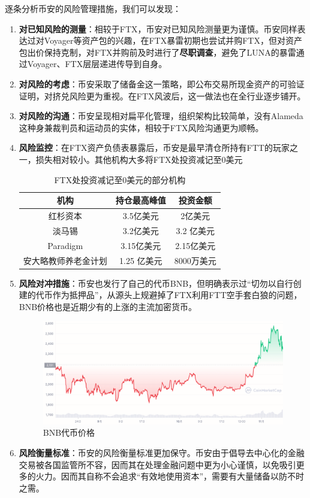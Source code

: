 逐条分析币安的风险管理措施，我们可以发现：
\begin{enumerate}
    \item \textbf{对已知风险的测量}：相较于FTX，币安对已知风险测量更为谨慎。币安同样表达过对Voyager等资产包的兴趣，在FTX暴雷初期也尝试并购FTX，但对资产包出价保持克制，对FTX并购前及时进行了\textbf{尽职调查}，避免了LUNA的暴雷通过Voyager、FTX层层递进传导到自身。
    \item \textbf{对风险的考虑}：币安采取了储备金这一策略，即公布交易所现金资产的可验证证明，对挤兑风险更为重视。在FTX风波后，这一做法也在全行业逐步铺开。
    \item \textbf{对风险的沟通}：币安呈现相对扁平化管理，组织架构比较简单，没有Alameda这种身兼裁判员和运动员的实体，相较于FTX风险沟通更为顺畅。
    \item \textbf{风险监控}：在FTX资产负债表暴露后，币安是最早清仓所持有FTT的玩家之一，损失相对较小。其他机构大多将FTX处投资减记至0美元
    \begin{table}[H]
        \centering
        \begin{tabular}{|c|c|c|}
            \hline
            机构&持仓最高峰值&投资金额\\\hline
            红杉资本&3.5亿美元&2亿美元\\
            淡马锡&3.2亿美元&3.2 亿美元\\
            Paradigm&3.15亿美元&2.15亿美元\\
            安大略教师养老金计划&1.25 亿美元&8000万美元\\\hline
        \end{tabular}
        \caption{FTX处投资减记至0美元的部分机构}
    \end{table}
    \item \textbf{风险对冲措施}：币安也发行了自己的代币BNB，但明确表示过“切勿以自行创建的代币作为抵押品”，从源头上规避掉了FTX利用FTT空手套白狼的问题，BNB价格也是近期少有的上涨的主流加密货币。
    \begin{figure}[H]
        \includegraphics[width=\linewidth]{img/bnb.png}
        \caption{BNB代币价格}
    \end{figure}
    \item \textbf{风险衡量标准}：币安的风险衡量标准更加保守。币安由于倡导去中心化的金融交易被各国监管所不容，因而其在处理金融问题中更为小心谨慎，以免吸引更多的火力。因而其自称不会追求“有效地使用资本”，需要有大量储备以防不时之需。
\end{enumerate}

